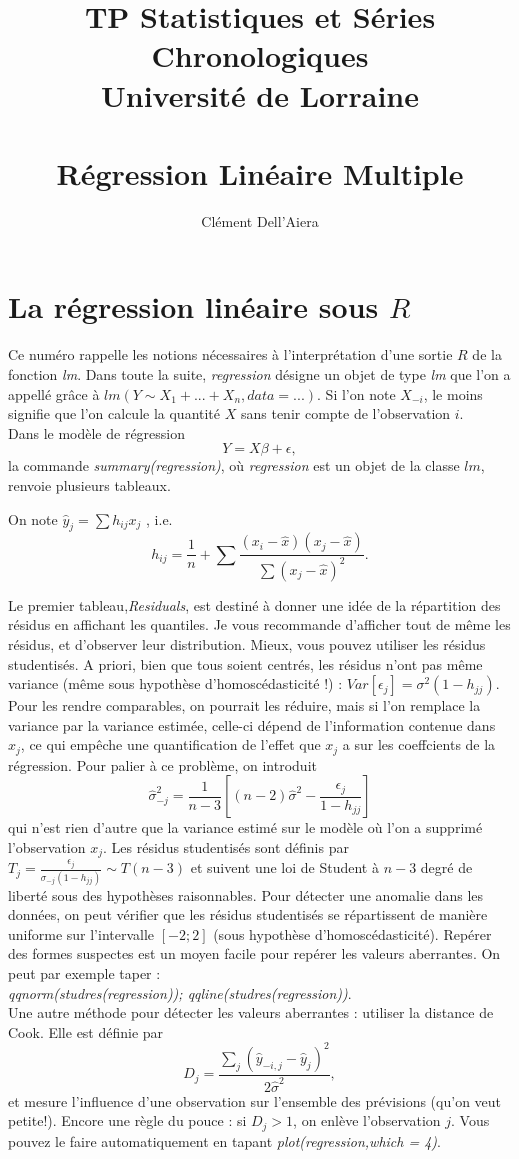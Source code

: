 \documentclass[a4paper]{article}
\title{TP Statistiques et Séries Chronologiques  \\ Université de Lorraine \\ ~ \\
\textbf{Régression Linéaire Multiple}}
\date{} %
\author{ Clément Dell'Aiera }
\begin{document}
  
\maketitle


\section{La régression linéaire sous $R$}

Ce numéro rappelle les notions nécessaires à l'interprétation d'une sortie $R$ de la fonction \textit{lm}. Dans toute la suite, \textit{regression} désigne un objet de type \textit{lm} que l'on a appellé grâce à $lm(Y\sim X_1+...+X_n, data=...)$. Si l'on note $X_{-i}$, le moins signifie que l'on calcule la quantité $X$ sans tenir compte de l'observation $i$.\\

Dans le modèle de régression \[Y=X\beta + \epsilon ,\]
la commande \textit{summary(regression)}, où \textit{regression} est un objet de la classe $lm$, renvoie plusieurs tableaux. 

On note $\hat y_j =  \sum h_{ij}x_j$ , i.e. \[h_{ij}= \frac{1}{n}+\sum \frac{(x_i-\hat x)(x_j-\hat x)}{\sum (x_j-\hat x)^2}.\]

Le premier tableau,\textit{Residuals}, est destiné à donner une idée de la répartition des résidus en affichant les quantiles.  Je vous recommande d'afficher tout de même les résidus, et d'observer leur distribution. Mieux, vous pouvez utiliser les résidus studentisés. A priori, bien que tous soient centrés, les résidus n'ont pas même variance (même sous hypothèse d'homoscédasticité !) : $Var[\epsilon_j]=\sigma^2(1-h_{jj})$. Pour les rendre comparables, on pourrait les réduire, mais si l'on remplace la variance par la variance estimée, celle-ci dépend de l'information contenue dans $x_j$, ce qui empêche une quantification de l'effet que $x_j$ a sur les coeffcients de la régression. Pour palier à ce problème, on introduit 
\[\hat \sigma_{-j}^2 = \frac{1}{n-3}[(n-2)\hat \sigma^2-\frac{\epsilon_j}{1-h_{jj}}]\]
qui n'est rien d'autre que la variance estimé sur le modèle où l'on a supprimé l'observation $x_j$. Les résidus studentisés sont définis par $T_j = \frac{\epsilon_j}{\sigma_{-j}(1-h_{jj})}\sim T(n-3)$ et suivent une loi de Student à $n-3$ degré de liberté sous des hypothèses raisonnables. Pour détecter une anomalie dans les données, on peut vérifier que les résidus studentisés se répartissent de manière uniforme sur l'intervalle $[-2;2]$ (sous hypothèse d'homoscédasticité). Repérer des formes suspectes est un moyen facile pour repérer les valeurs aberrantes. On peut par exemple taper : \\
\textit{qqnorm(studres(regression)); qqline(studres(regression))}.\\
Une autre méthode pour détecter les valeurs aberrantes : utiliser la distance de Cook. Elle est définie par 
\[D_j= \frac{\sum_j (\hat y_{-i,j}-\hat y_j)^2}{2\hat \sigma^2},\]
et mesure l'influence d'une observation sur l'ensemble des prévisions (qu'on veut petite!). Encore une règle du pouce : si $D_j>1$, on enlève l'observation $j$. Vous pouvez le faire automatiquement en tapant \textit{plot(regression,which = 4)}.
\end{document}
